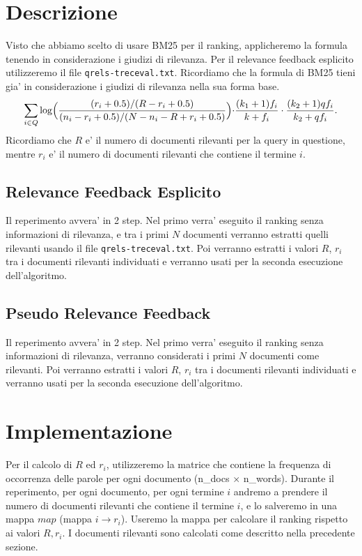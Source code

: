 \documentclass[12pt]{article}
\begin{document}
\maketitle

\section{Descrizione}

Visto che abbiamo scelto di usare BM25 per il ranking, applicheremo la formula tenendo in considerazione i giudizi di rilevanza. Per il relevance feedback esplicito utilizzeremo il file \texttt{qrels-treceval.txt}. Ricordiamo che la formula di BM25 tieni gia' in considerazione i giudizi di rilevanza nella sua forma base. 
\[ \sum\limits_{i \in Q}\log\Bigl(\frac{(r_i+0.5)/(R-r_i+0.5)}{(n_i-r_i+0.5)/(N-n_i-R+r_i+0.5)}\Bigl)\cdot\frac{(k_1+1)f_i}{k+f_i}\cdot\frac{(k_2+1)qf_i}{k_2+qf_i}. \]
Ricordiamo che $R$ e' il numero di documenti rilevanti per la query in questione, mentre $r_i$ e' il numero di documenti rilevanti che contiene il termine $i$.

\subsection{Relevance Feedback Esplicito}
Il reperimento avvera' in 2 step. Nel primo verra' eseguito il ranking senza informazioni di rilevanza, e tra i primi $N$ documenti verranno estratti quelli rilevanti usando il file \texttt{qrels-treceval.txt}. Poi verranno estratti i valori $R$, $r_i$ tra i documenti rilevanti individuati e verranno usati per la seconda esecuzione dell'algoritmo.

\subsection{Pseudo Relevance Feedback}
Il reperimento avvera' in 2 step. Nel primo verra' eseguito il ranking senza informazioni di rilevanza, verranno considerati i primi $N$ documenti come rilevanti. Poi verranno estratti i valori $R$, $r_i$ tra i documenti rilevanti individuati e verranno usati per la seconda esecuzione dell'algoritmo.

\section{Implementazione}
Per il calcolo di $R$ ed $r_i$, utilizzeremo la matrice che contiene la frequenza di occorrenza delle parole per ogni documento (n\_docs $\times$ n\_words). Durante il reperimento, per ogni documento, per ogni termine $i$ andremo a prendere il numero di documenti rilevanti che contiene il termine $i$, e lo salveremo in una mappa $map$ (mappa $i \rightarrow r_i$). Useremo la mappa per calcolare il ranking rispetto ai valori $R, r_i$. I documenti rilevanti sono calcolati come descritto nella precedente sezione.
\end{document}
